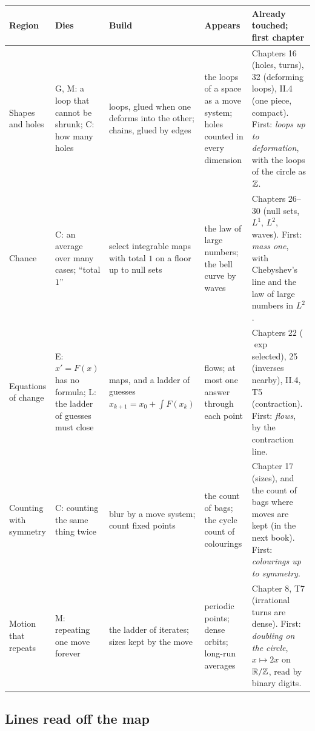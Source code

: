 {\small
\renewcommand{\arraystretch}{1.25}
\setlength{\tabcolsep}{4pt}
\begin{longtable}{@{}>{\raggedright\arraybackslash}p{2.2cm}
                     >{\raggedright\arraybackslash}p{3.0cm}
                     >{\raggedright\arraybackslash}p{2.8cm}
                     >{\raggedright\arraybackslash}p{2.6cm}
                     >{\raggedright\arraybackslash}p{3.2cm}@{}}
\textbf{Region} & \textbf{Dies} & \textbf{Build} & \textbf{Appears} & \textbf{Already touched; first chapter} \\ \hline
\endhead
Shapes and holes & G, M: a loop that cannot be shrunk; C: how many holes & loops, glued when one deforms into the other; chains, glued by edges & the loops of a space as a move system; holes counted in every dimension & Chapters 16 (holes, turns), 32 (deforming loops), II.4 (one piece, compact). First: \emph{loops up to deformation}, with the loops of the circle as $\mathbb{Z}$. \\
Chance & C: an average over many cases; ``total $1$'' & select integrable maps with total $1$ on a floor up to null sets & the law of large numbers; the bell curve by waves & Chapters 26--30 (null sets, $L^1$, $L^2$, waves). First: \emph{mass one}, with Chebyshev's line and the law of large numbers in $L^2$. \\
Equations of change & E: $x' = F(x)$ has no formula; L: the ladder of guesses must close & maps, and a ladder of guesses $x_{k+1} = x_0 + \int F(x_k)$ & flows; at most one answer through each point & Chapters 22 ($\exp$ selected), 25 (inverses nearby), II.4, T5 (contraction). First: \emph{flows}, by the contraction line. \\
Counting with symmetry & C: counting the same thing twice & blur by a move system; count fixed points & the count of bags; the cycle count of colourings & Chapter 17 (sizes), and the count of bags where moves are kept (in the next book). First: \emph{colourings up to symmetry}. \\
Motion that repeats & M: repeating one move forever & the ladder of iterates; sizes kept by the move & periodic points; dense orbits; long-run averages & Chapter 8, T7 (irrational turns are dense). First: \emph{doubling on the circle}, $x \mapsto 2x$ on $\mathbb{R}/\mathbb{Z}$, read by binary digits. \\
\end{longtable}
}

\subsection*{Lines read off the map}

